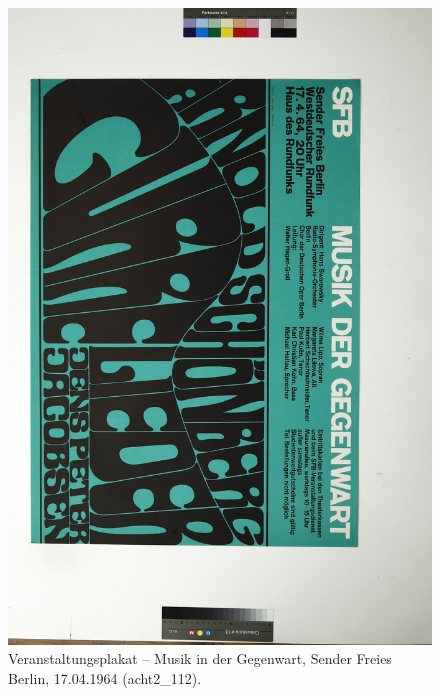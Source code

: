 \documentclass[a4paper,12pt,ngerman]{article}
\begin{document}
\newpage
\begin{landscape}
\begin{figure}[ht]
\includegraphics[height=0.85\linewidth, angle=90]{Abbildung_21_(acht2_112)}
\centering
\caption{Veranstaltungsplakat – Musik in der Gegenwart, Sender Freies Berlin, 17.04.1964 (acht2\_112).}
\end{figure}
\end{landscape}
\end{document}
